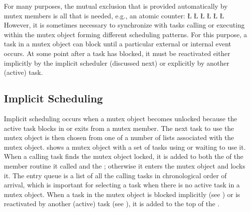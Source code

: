 \documentclass[openright,twoside]{report}
\begin{document}
For many purposes, the mutual exclusion that is provided automatically by mutex members is all that is needed, e.g., an atomic counter:
\LGinlinefalse\LGbegin\lgrinde
\L{}
\L{\LB{}}
\L{}
\L{}
\L{}
\CE{}\L{\LB{\}}}
\endlgrinde\LGend
However, it is sometimes necessary to synchronize with tasks calling or executing within the mutex object forming different scheduling patterns.
For this purpose, a task in a mutex object can block until a particular external or internal event occurs.
At some point after a task has blocked, it must be reactivated either implicitly by the implicit scheduler (discussed next) or explicitly by another (active) task.


\subsection{Implicit Scheduling}
\label{s:ImplicitScheduling}

Implicit scheduling occurs when a mutex object becomes unlocked because the active task blocks in or exits from a mutex member.
The next task to use the mutex object is then chosen from one of a number of lists associated with the mutex object.
 shows a mutex object with a set of tasks using or waiting to use it.
When a calling task finds the mutex object locked, it is added to both the  of the member routine it called and the ;
otherwise it enters the mutex object and locks it.
The entry queue is a list of all the calling tasks in chronological order of arrival, which is important for selecting a task when there is no active task in a mutex object.
When a task in the mutex object is blocked implicitly (see ) or is reactivated by another (active) task (see ), it is added to the top of the .
\end{document}
